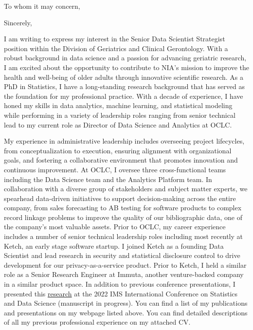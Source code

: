 \documentclass[11pt,letterpaper,sans]{moderncv}        %
\newcommand{\CompanyName}{National Institute on Aging}
\newcommand{\Location}{Bethesda, MD, United States}
\begin{document}
\recipient{\CompanyName}{\Location}
\date{\today}
\opening{To whom it may concern,}
\closing{Sincerely,}
\makelettertitle

I am writing to express my interest in the Senior Data Scientist Strategist position within the Division of Geriatrics and Clinical Gerontology. With a robust background in data science and a passion for advancing geriatric research, I am excited about the opportunity to contribute to NIA's mission to improve the health and well-being of older adults through innovative scientific research. As a PhD in Statistics, I have a long-standing research background that has served as the foundation for my professional practice. With a decade of experience, I have honed my skills in data analytics, machine learning, and statistical modeling while performing in a variety of leadership roles ranging from senior technical lead to my current role as Director of Data Science and Analytics at OCLC. 

My experience in administrative leadership includes overseeing project lifecycles, from conceptualization to execution, ensuring alignment with organizational goals, and fostering a collaborative environment that promotes innovation and continuous improvement. At OCLC, I oversee three cross-functional teams including the Data Science team and the Analytics Platform team. In collaboration with a diverse group of stakeholders and subject matter experts, we spearhead data-driven initiatives to support decision-making across the entire company, from sales forecasting to AB testing for software products to complex record linkage problems to improve the quality of our bibliographic data, one of the company's most valuable assets.  Prior to OCLC, my career experience includes a number of senior technical leadership roles including most recently at Ketch, an early stage software startup. I joined Ketch as a founding Data Scientist and lead research in security and statistical disclosure control to drive development for our privacy-as-a-service product. Prior to Ketch, I held a similar role as a Senior Research Engineer at Immuta, another venture-backed company in a similar product space. In addition to previous conference presentations, I presented this \href{https://taylerablake.github.io/img/risk-quantification.pdf}{\color{blue}research} at the 2022 IMS International Conference on Statistics and Data Science (manuscript in progress). You can find a list of my publications and presentations on my webpage listed above. You can find detailed descriptions of all my previous professional experience on my attached CV.
\end{document}

